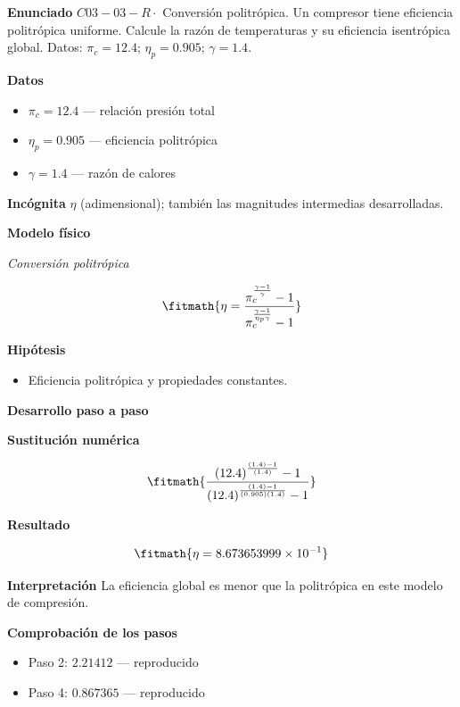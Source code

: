 \documentclass[10pt,openany]{book}
\begin{document}
\begin{tcolorbox}[title={Problema resuelto 3}, studiumworked, breakable]

\noindent\textbf{Enunciado}
\(C03-03-R \cdot\) Conversión politrópica. Un compresor tiene eficiencia politrópica uniforme. Calcule la razón de temperaturas y su eficiencia isentrópica global. Datos: \(\pi_c=12.4\); \(\eta_p=0.905\); \(\gamma=1.4\).

\noindent\textbf{Datos}
\begin{itemize}
\item $\pi_c = 12.4$ — relación presión total
\item $\eta_p = 0.905$ — eficiencia politrópica
\item $\gamma = 1.4$ — razón de calores
\end{itemize}

\noindent\textbf{Incógnita}
$\eta$ (adimensional); también las magnitudes intermedias desarrolladas.

\noindent\textbf{Modelo físico}

\noindent\textit{Conversión politrópica}

\[
\fitmath{\eta=\frac{\pi_c^{\frac{\gamma - 1}{\gamma}} - 1}{\pi_c^{\frac{\gamma - 1}{\eta_p \gamma}} - 1}}
\]

\noindent\textbf{Hipótesis}
\begin{itemize}
\item Eficiencia politrópica y propiedades constantes.
\end{itemize}

\noindent\textbf{Desarrollo paso a paso}



\noindent\textbf{Sustitución numérica}

\[
\fitmath{\frac{\left(12.4\right)^{\frac{\left(1.4\right) - 1}{\left(1.4\right)}} - 1}{\left(12.4\right)^{\frac{\left(1.4\right) - 1}{\left(0.905\right) \left(1.4\right)}} - 1}}
\]

\noindent\textbf{Resultado}

\[
\fitmath{\eta=8.673653999\times10^{-1}}
\]

\noindent\textbf{Interpretación}
La eficiencia global es menor que la politrópica en este modelo de compresión.

\noindent\textbf{Comprobación de los pasos}
\begin{itemize}
\item Paso 2: $2.21412$ — reproducido
\item Paso 4: $0.867365$ — reproducido
\end{itemize}


\end{tcolorbox}
\end{document}
